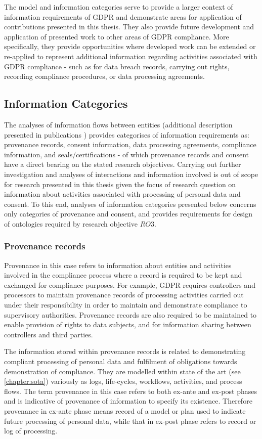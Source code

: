 The model and information categories serve to provide a larger context of information requirements of GDPR and demonstrate areas for application of contributions presented in this thesis. They also provide future development and application of presented work to other areas of GDPR compliance. More specifically, they provide opportunities where developed work can be extended or re-applied to represent additional information regarding activities associated with GDPR compliance - such as for data breach records, carrying out rights, recording compliance procedures, or data processing agreements.

\subsection*{Information Categories}
The analyses of information flows between entities (additional description presented in publications \cite{pandit_exploration_2018,pandit_gdpr_2018}) provides categorises of information requirements as: provenance records, consent information, data processing agreements, compliance information, and seals/certifications - of which provenance records and consent have a direct bearing on the stated research objectives.
Carrying out further investigation and analyses of interactions and information involved is out of scope for research presented in this thesis given the focus of research question on information about activities associated with processing of personal data and consent.
To this end, analyses of information categories presented below concerns only categories of provenance and consent, and provides requirements for design of ontologies required by research objective $RO3$.

\subsubsection*{Provenance records}
Provenance in this case refers to information about entities and activities involved in the compliance process where a record is required to be kept and exchanged for compliance purposes. For example, GDPR requires controllers and processors to maintain provenance records of processing activities carried out under their responsibility in order to maintain and demonstrate compliance to supervisory authorities. Provenance records are also required to be maintained to enable provision of rights to data subjects, and for information sharing between controllers and third parties.

The information stored within provenance records is related to demonstrating compliant processing of personal data and fulfilment of obligations towards demonstration of compliance. They are modelled within state of the art (see \autoref{chapter:sota}) variously as logs, life-cycles, workflows, activities, and process flows. The term provenance in this case refers to both ex-ante and ex-post phases and is indicative of provenance of information to specify its existence. Therefore provenance in ex-ante phase means record of a model or plan used to indicate future processing of personal data, while that in ex-post phase refers to record or log of processing.

